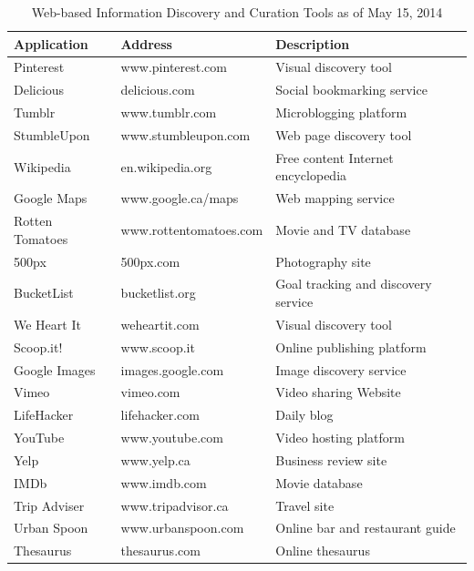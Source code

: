 \documentclass{sigchi}
\begin{document}
{\begin{table}[htbp]
\begin{tabular}{|p{}| p{}| p{}|}
\hline
\textbf{Application} & \textbf{Address} & \textbf{Description}
\\
\hline
Pinterest       & www.pinterest.com 	& Visual discovery tool \\
\hline
Delicious       & delicious.com 		& Social bookmarking service \\
\hline
Tumblr          & www.tumblr.com 		& Microblogging platform \\
\hline
StumbleUpon     & www.stumbleupon.com  	& Web page discovery tool \\
\hline
Wikipedia       & en.wikipedia.org   	& Free content Internet encyclopedia\\
\hline
Google Maps     & www.google.ca/maps  	& Web mapping service\\
\hline
Rotten Tomatoes & www.rottentomatoes.com & Movie and TV database\\
\hline
500px           & 500px.com            	& Photography site\\
\hline
BucketList      & bucketlist.org  		& Goal tracking and discovery service\\
\hline
We Heart It     & weheartit.com 		& Visual discovery tool \\
\hline
Scoop.it!       & www.scoop.it 			& Online publishing platform \\
\hline
Google Images   & images.google.com  	& Image discovery service \\
\hline
Vimeo           & vimeo.com  			& Video sharing Website\\
\hline
LifeHacker      & lifehacker.com        & Daily blog \\
\hline
YouTube         & www.youtube.com 		& Video hosting platform \\
\hline
Yelp            & www.yelp.ca  			& Business review site\\
\hline
IMDb            & www.imdb.com  		& Movie database \\
\hline
Trip Adviser    & www.tripadvisor.ca 	& Travel site \\
\hline
Urban Spoon     & www.urbanspoon.com    & Online bar and restaurant guide\\
\hline
Thesaurus       & thesaurus.com         & Online thesaurus \\
\hline
\end{tabular}
\caption{Web-based Information Discovery and Curation Tools as of May 15, 2014}
\end{table}
} %
\end{document}
